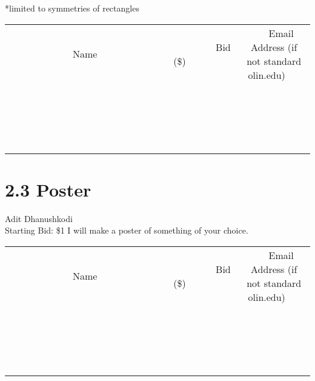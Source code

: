 \documentclass[11pt]{article}
\begin{document}
*limited to symmetries of rectangles
\\[3ex]
\begin{tabular}{c c c}
~~~~~~~~~~~~~Name~~~~~~~~~~~~~ & ~~~~~~~~~Bid (\$)~~~~~~~~~  & ~~~Email Address (if not standard olin.edu)~~~\\
 & & \\
\hline
 & & \\
\hline
 & & \\
\hline
 & & \\
\hline
 & & \\
\hline
 & & \\
\hline
 & & \\
\hline
 & & \\
\hline
 & & \\
\hline
 & & \\
\hline
 & & \\
\hline
 & & \\
\hline
 & & \\
\hline
 & & \\
\hline
 & & \\
\hline
 & & \\
\hline
 & & \\
\hline
 & & \\
\hline
 & & \\
\hline
\end{tabular}
\newpage
\section*{2.3 Poster}
Adit Dhanushkodi
\\
Starting Bid: \$1
\newline
I will make a poster of something of your choice.
\\[3ex]
\begin{tabular}{c c c}
~~~~~~~~~~~~~Name~~~~~~~~~~~~~ & ~~~~~~~~~Bid (\$)~~~~~~~~~  & ~~~Email Address (if not standard olin.edu)~~~\\
 & & \\
\hline
 & & \\
\hline
 & & \\
\hline
 & & \\
\hline
 & & \\
\hline
 & & \\
\hline
 & & \\
\hline
 & & \\
\hline
 & & \\
\hline
 & & \\
\hline
 & & \\
\hline
 & & \\
\hline
 & & \\
\hline
 & & \\
\hline
 & & \\
\hline
 & & \\
\hline
 & & \\
\hline
 & & \\
\hline
 & & \\
\hline
\end{tabular}
\newpage
\end{document}
